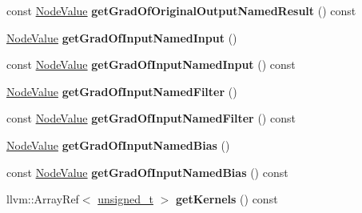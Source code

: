 \begin{DoxyCompactItemize}
\mbox{\label{classglow_1_1_convolution3_d_grad_node_a0e465fa6be51d922c76eea605ffacb79}} 
const \hyperlink{structglow_1_1_node_value}{Node\+Value} {\bfseries get\+Grad\+Of\+Original\+Output\+Named\+Result} () const
\item 
\mbox{\label{classglow_1_1_convolution3_d_grad_node_a564cfc1e01662e92028b848ad971910b}} 
\hyperlink{structglow_1_1_node_value}{Node\+Value} {\bfseries get\+Grad\+Of\+Input\+Named\+Input} ()
\item 
\mbox{\label{classglow_1_1_convolution3_d_grad_node_a31f0f1c0c306b13e6eef226ecbf545df}} 
const \hyperlink{structglow_1_1_node_value}{Node\+Value} {\bfseries get\+Grad\+Of\+Input\+Named\+Input} () const
\item 
\mbox{\label{classglow_1_1_convolution3_d_grad_node_abf039ec7de1e984e126aea0e12caa070}} 
\hyperlink{structglow_1_1_node_value}{Node\+Value} {\bfseries get\+Grad\+Of\+Input\+Named\+Filter} ()
\item 
\mbox{\label{classglow_1_1_convolution3_d_grad_node_a5c0c8739b7567b6ae60d57dc82b5f19f}} 
const \hyperlink{structglow_1_1_node_value}{Node\+Value} {\bfseries get\+Grad\+Of\+Input\+Named\+Filter} () const
\item 
\mbox{\label{classglow_1_1_convolution3_d_grad_node_a188e467b26e4bade4d646f4403cc7a21}} 
\hyperlink{structglow_1_1_node_value}{Node\+Value} {\bfseries get\+Grad\+Of\+Input\+Named\+Bias} ()
\item 
\mbox{\label{classglow_1_1_convolution3_d_grad_node_a6f67e188d23a1d9098dd146c9dcdbf5f}} 
const \hyperlink{structglow_1_1_node_value}{Node\+Value} {\bfseries get\+Grad\+Of\+Input\+Named\+Bias} () const
\item 
\mbox{\label{classglow_1_1_convolution3_d_grad_node_ae625f4017edbb5bdb256daf1277e8d4a}} 
llvm\+::\+Array\+Ref$<$ \hyperlink{namespaceglow_a0ca574644e1e42ef193a9947fb4d8911}{unsigned\+\_\+t} $>$ {\bfseries get\+Kernels} () const

\end{DoxyCompactItemize}
